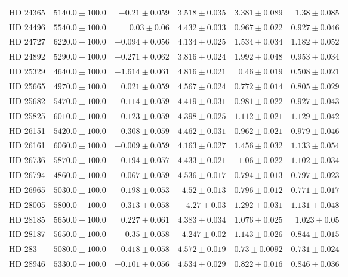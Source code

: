\begin{longtable*}{lrrrrr}
HD 24365 & $5140.0\pm 100.0$ & $-0.21\pm 0.059$ & $3.518\pm 0.035$ & $3.381\pm 0.089$ & $1.38\pm 0.085$ \\ 
HD 24496 & $5540.0\pm 100.0$ & $0.03\pm 0.06$ & $4.432\pm 0.033$ & $0.967\pm 0.022$ & $0.927\pm 0.046$ \\ 
HD 24727 & $6220.0\pm 100.0$ & $-0.094\pm 0.056$ & $4.134\pm 0.025$ & $1.534\pm 0.034$ & $1.182\pm 0.052$ \\ 
HD 24892 & $5290.0\pm 100.0$ & $-0.271\pm 0.062$ & $3.816\pm 0.024$ & $1.992\pm 0.048$ & $0.953\pm 0.034$ \\ 
HD 25329 & $4640.0\pm 100.0$ & $-1.614\pm 0.061$ & $4.816\pm 0.021$ & $0.46\pm 0.019$ & $0.508\pm 0.021$ \\ 
HD 25665 & $4970.0\pm 100.0$ & $0.021\pm 0.059$ & $4.567\pm 0.024$ & $0.772\pm 0.014$ & $0.805\pm 0.029$ \\ 
HD 25682 & $5470.0\pm 100.0$ & $0.114\pm 0.059$ & $4.419\pm 0.031$ & $0.981\pm 0.022$ & $0.927\pm 0.043$ \\ 
HD 25825 & $6010.0\pm 100.0$ & $0.123\pm 0.059$ & $4.398\pm 0.025$ & $1.112\pm 0.021$ & $1.129\pm 0.042$ \\ 
HD 26151 & $5420.0\pm 100.0$ & $0.308\pm 0.059$ & $4.462\pm 0.031$ & $0.962\pm 0.021$ & $0.979\pm 0.046$ \\ 
HD 26161 & $6060.0\pm 100.0$ & $-0.009\pm 0.059$ & $4.163\pm 0.027$ & $1.456\pm 0.032$ & $1.133\pm 0.054$ \\ 
HD 26736 & $5870.0\pm 100.0$ & $0.194\pm 0.057$ & $4.433\pm 0.021$ & $1.06\pm 0.022$ & $1.102\pm 0.034$ \\ 
HD 26794 & $4860.0\pm 100.0$ & $0.067\pm 0.059$ & $4.536\pm 0.017$ & $0.794\pm 0.013$ & $0.797\pm 0.023$ \\ 
HD 26965 & $5030.0\pm 100.0$ & $-0.198\pm 0.053$ & $4.52\pm 0.013$ & $0.796\pm 0.012$ & $0.771\pm 0.017$ \\ 
HD 28005 & $5800.0\pm 100.0$ & $0.313\pm 0.058$ & $4.27\pm 0.03$ & $1.292\pm 0.031$ & $1.131\pm 0.048$ \\ 
HD 28185 & $5650.0\pm 100.0$ & $0.227\pm 0.061$ & $4.383\pm 0.034$ & $1.076\pm 0.025$ & $1.023\pm 0.05$ \\ 
HD 28187 & $5650.0\pm 100.0$ & $-0.35\pm 0.058$ & $4.247\pm 0.02$ & $1.143\pm 0.026$ & $0.844\pm 0.015$ \\ 
HD 283 & $5080.0\pm 100.0$ & $-0.418\pm 0.058$ & $4.572\pm 0.019$ & $0.73\pm 0.0092$ & $0.731\pm 0.024$ \\ 
HD 28946 & $5330.0\pm 100.0$ & $-0.101\pm 0.056$ & $4.534\pm 0.029$ & $0.822\pm 0.016$ & $0.846\pm 0.036$ \\ 

\end{longtable*}
